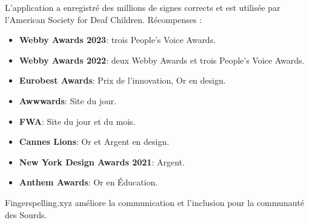 L'application a enregistré des millions de signes corrects et est utilisée par l'American Society for Deaf Children. Récompenses :
\begin{itemize}
    \item \textbf{Webby Awards 2023}: trois People's Voice Awards. 
    \item \textbf{Webby Awards 2022}: deux Webby Awards et trois People's Voice Awards.
    \item \textbf{Eurobest Awards}: Prix de l'innovation, Or en design.
    \item \textbf{Awwwards}: Site du jour.
    \item \textbf{FWA}: Site du jour et du mois.
    \item \textbf{Cannes Lions}: Or et Argent en design.
    \item \textbf{New York Design Awards 2021}: Argent.
    \item \textbf{Anthem Awards}: Or en Éducation.
\end{itemize}

Fingerspelling.xyz améliore la communication et l'inclusion pour la communauté des Sourds.
